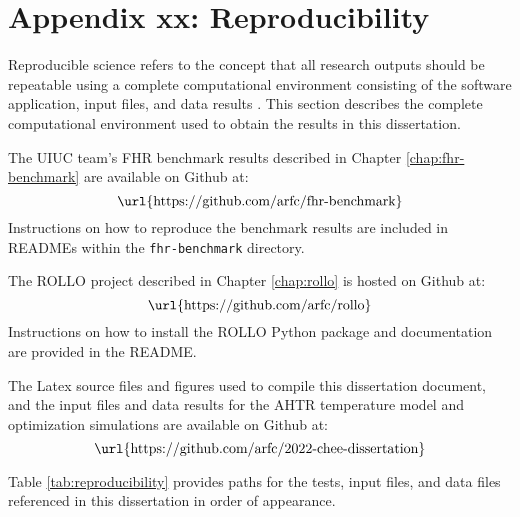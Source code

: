 \chapter{Appendix xx: Reproducibility} 

Reproducible science refers to the concept that all research outputs should be 
repeatable using a complete computational environment consisting of the software 
application, input files, and data results \cite{novak_multiscale_2020}.
This section describes the complete computational environment used to obtain the 
results in this dissertation.

The UIUC team's \gls{FHR} benchmark results described in Chapter \ref{chap:fhr-benchmark} 
are available on Github at: 
\begin{equation*}
\mbox{\url{https://github.com/arfc/fhr-benchmark}}
\end{equation*}
Instructions on how to reproduce the benchmark results are included in READMEs within 
the \texttt{fhr-benchmark} directory. 

The \gls{ROLLO} project described in Chapter \ref{chap:rollo} is hosted on Github at: 
\begin{equation*}
    \mbox{\url{https://github.com/arfc/rollo}}
\end{equation*}
Instructions on how to install the \gls{ROLLO} Python package and documentation are 
provided in the README. 

The Latex source files and figures used to compile this dissertation document, and 
the input files and data results for the AHTR temperature model and optimization 
simulations are available on Github at:  
\begin{equation*}
    \mbox{\url{https://github.com/arfc/2022-chee-dissertation}}
\end{equation*}

Table \ref{tab:reproducibility} provides paths for the tests, input files, and data 
files referenced in this dissertation in order of appearance. 

